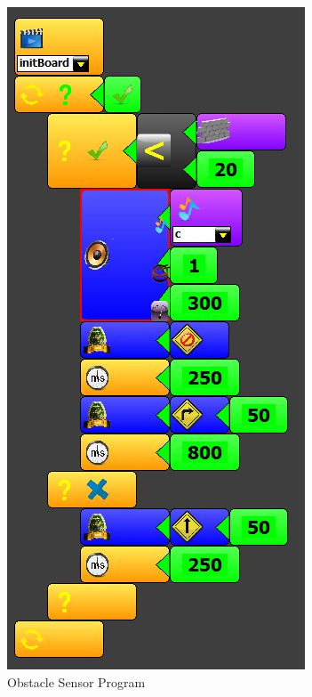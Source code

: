 \documentclass[conference]{IEEEtran}
\begin{document}
\begin{figure}[h]
\centering
\includegraphics[scale=0.5]{Fig_14.png}
\caption{Obstacle Sensor Program}
\end{figure}
\end{document}
